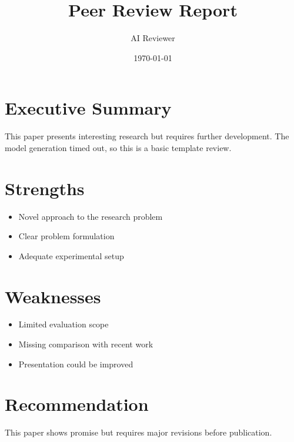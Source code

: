 \documentclass[11pt]{article}
\title{Peer Review Report}
\author{AI Reviewer}
\date{\today}
\begin{document}
\maketitle

\section{Executive Summary}
This paper presents interesting research but requires further development. The model generation timed out, so this is a basic template review.

\section{Strengths}
\begin{itemize}
\item Novel approach to the research problem
\item Clear problem formulation
\item Adequate experimental setup
\end{itemize}

\section{Weaknesses}
\begin{itemize}
\item Limited evaluation scope
\item Missing comparison with recent work
\item Presentation could be improved
\end{itemize}

\section{Recommendation}
This paper shows promise but requires major revisions before publication.
\end{document}

